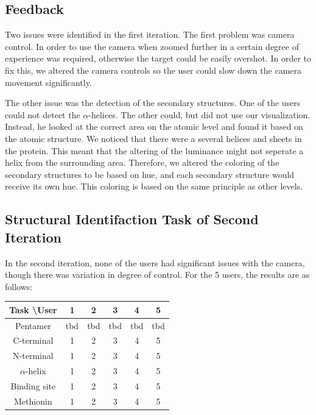 \documentclass[review,journal]{vgtc}         %
\begin{document}
\subsection{Feedback}
Two issues were identified in the first iteration. 
The first problem was camera control. 
In order to use the camera when zoomed further in a certain degree of experience was required, otherwise the target could be easily overshot.
In order to fix this, we altered the camera controls so the user could slow down the camera movement significantly.

The other issue was the detection of the secondary structures. 
One of the users could not detect the $\alpha$-helices. The other could, but did not use our visualization.
Instead, he looked at the correct area on the atomic level and found it based on the atomic structure.
We noticed that there were a several helices and sheets in the protein. 
This meant that the altering of the luminance might not seperate a helix from the surrounding area. 
Therefore, we altered the coloring of the secondary structures to be based on hue, and each secondary structure would receive its own hue.
This coloring is based on the same principle as other levels.


\subsection{Structural Identifaction Task of Second Iteration}
In the second iteration, none of the users had significant issues with the camera, though there was variation in degree of control.
For the 5 users, the results are as follows:

\begin{tabular}{| c | c | c | c | c | c |}
	\hline
	Task \textbackslash User & 1 & 2 & 3 & 4 & 5 \\
	\hline
	Pentamer& tbd & tbd & tbd & tbd & tbd \\
	\hline
	C-terminal & 1 & 2 & 3 & 4 & 5 \\
	\hline
	N-terminal & 1 & 2 & 3 & 4 & 5 \\
	\hline
	$\alpha$-helix & 1 & 2 & 3 & 4 & 5 \\
	\hline
	Binding site & 1 & 2 & 3 & 4 & 5 \\
	\hline
	Methionin & 1 & 2 & 3 & 4 & 5 \\
	\hline
\end{tabular}
\end{document}
